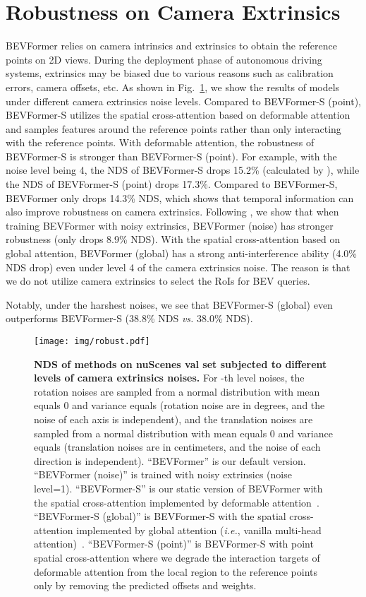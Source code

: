 \documentclass{article}
\def\ie{\emph{i.e.}}
\begin{document}
\section{Robustness on Camera Extrinsics}
BEVFormer relies on camera intrinsics and extrinsics to obtain the reference points on 2D views. During the deployment phase of autonomous driving systems, extrinsics may be biased due to various reasons such as calibration errors, camera offsets, etc. As shown in Fig.~\ref{fig:noise}, we show the results of models under different camera extrinsics noise levels.
Compared to BEVFormer-S (point), BEVFormer-S utilizes the spatial cross-attention based on deformable attention~\cite{zhu2020deformable} and samples features around the reference points rather than only interacting with the reference points. 
With deformable attention, the robustness of 
BEVFormer-S  is stronger than BEVFormer-S (point). For example, with the noise level being 4, the NDS of BEVFormer-S drops 15.2\% (calculated by ), while the NDS of BEVFormer-S (point) drops 17.3\%. Compared to BEVFormer-S, BEVFormer only drops 14.3\% NDS, which shows that temporal information can also improve robustness on camera extrinsics.
Following \cite{philion2020lift}, we show that when training BEVFormer with noisy extrinsics, BEVFormer (noise) has stronger robustness (only drops 8.9\% NDS). With the spatial cross-attention based on global attention, BEVFormer (global) has a strong anti-interference ability (4.0\% NDS drop) even under level 4 of the camera extrinsics noise. The reason is that we do not utilize camera extrinsics to select the RoIs for BEV queries.

Notably, under the harshest noises, we see that BEVFormer-S (global) even outperforms BEVFormer-S (38.8\% NDS \emph{vs.} 38.0\% NDS). 

\begin{figure}[t]
\centering

\texttt{[image: img/robust.pdf]}
\caption{\textbf{NDS of methods on nuScenes val set subjected to different levels of camera extrinsics noises.} For -th level noises, the rotation noises are sampled from a normal distribution with mean equals 0 and variance equals  (rotation noise are in degrees, and the noise of each axis is independent), and the translation noises are sampled from a normal distribution with mean equals 0 and variance equals  (translation noises are in centimeters,  and the noise of each direction is independent).
``BEVFormer'' is our default version.
``BEVFormer (noise)'' is trained with noisy extrinsics (noise level=1). 
``BEVFormer-S'' is our static version of BEVFormer with the spatial cross-attention implemented by deformable attention~\cite{zhu2020deformable}. ``BEVFormer-S (global)'' is BEVFormer-S with the spatial cross-attention implemented by global attention (\ie, vanilla multi-head attention)~\cite{vaswani2017attention}. ``BEVFormer-S (point)'' is BEVFormer-S with point spatial cross-attention where we degrade the interaction targets of deformable attention from the local region to the reference points only by removing the predicted offsets and weights. }
\label{fig:noise}

\end{figure}
\end{document}
